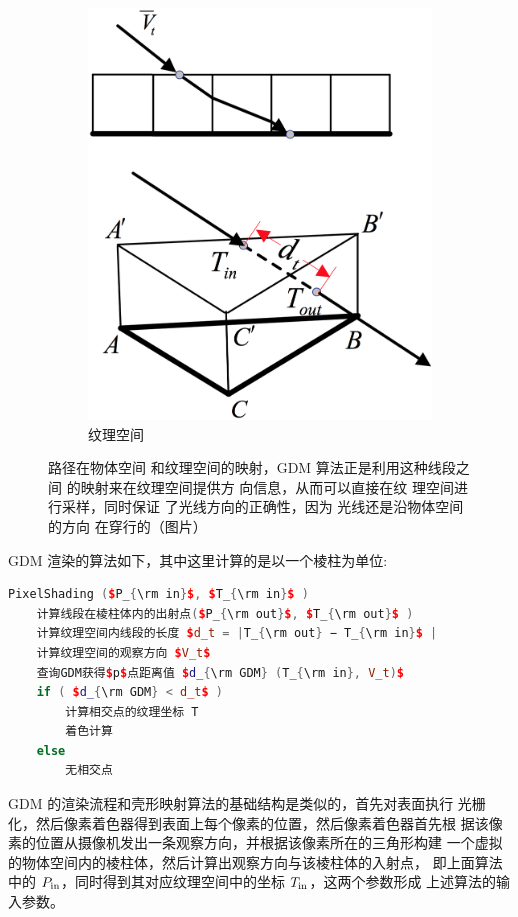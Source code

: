 \begin{figure}
{\begin{subfigure}[b]{0.315\textwidth}
		\includegraphics[width=\textwidth]{figures/df/GDM-texture-space-ray}
		\caption{纹理空间}
	\end{subfigure}
}
	\caption{路径在物体空间 和纹理空间的映射，GDM 算法正是利用这种线段之间 的映射来在纹理空间提供方 向信息，从而可以直接在纹 理空间进行采样，同时保证 了光线方向的正确性，因为 光线还是沿物体空间的方向 在穿行的（图片\cite{a:GeneralizedDisplacementMaps}）}
	\label{f:df-GDM-space-ray}
\end{figure}

GDM 渲染的算法如下，其中这里计算的是以一个棱柱为单位:

\begin{lstlisting}[language=C++, mathescape=true]
PixelShading ($P_{\rm in}$, $T_{\rm in}$ ) 
	计算线段在棱柱体内的出射点($P_{\rm out}$, $T_{\rm out}$ ) 
	计算纹理空间内线段的长度 $d_t = |T_{\rm out} − T_{\rm in}$ | 
	计算纹理空间的观察方向 $V_t$
	查询GDM获得$p$点距离值 $d_{\rm GDM} (T_{\rm in}, V_t)$
	if ( $d_{\rm GDM} < d_t$ )
		计算相交点的纹理坐标 T
		着色计算
	else
		无相交点
\end{lstlisting}

GDM 的渲染流程和壳形映射算法的基础结构是类似的，首先对表面执行 光栅化，然后像素着色器得到表面上每个像素的位置，然后像素着色器首先根 据该像素的位置从摄像机发出一条观察方向，并根据该像素所在的三角形构建 一个虚拟的物体空间内的棱柱体，然后计算出观察方向与该棱柱体的入射点， 即上面算法中的 $P_{\rm in}$，同时得到其对应纹理空间中的坐标 $T_{\rm in}$，这两个参数形成 上述算法的输入参数。

